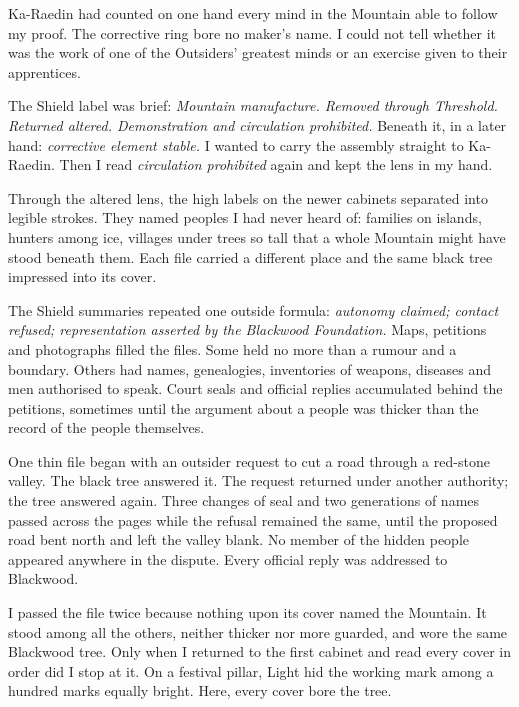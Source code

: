 Ka-Raedin had counted on one hand every mind in the Mountain able to follow my proof. The corrective ring bore no maker's name. I could not tell whether it was the work of one of the Outsiders' greatest minds or an exercise given to their apprentices.\par

The Shield label was brief: \textit{Mountain manufacture. Removed through Threshold. Returned altered. Demonstration and circulation prohibited.} Beneath it, in a later hand: \textit{corrective element stable.} I wanted to carry the assembly straight to Ka-Raedin. Then I read \textit{circulation prohibited} again and kept the lens in my hand.\par

Through the altered lens, the high labels on the newer cabinets separated into legible strokes. They named peoples I had never heard of: families on islands, hunters among ice, villages under trees so tall that a whole Mountain might have stood beneath them. Each file carried a different place and the same black tree impressed into its cover.\par

The Shield summaries repeated one outside formula: \textit{autonomy claimed; contact refused; representation asserted by the Blackwood Foundation.} Maps, petitions and photographs filled the files. Some held no more than a rumour and a boundary. Others had names, genealogies, inventories of weapons, diseases and men authorised to speak. Court seals and official replies accumulated behind the petitions, sometimes until the argument about a people was thicker than the record of the people themselves. \par

One thin file began with an outsider request to cut a road through a red-stone valley. The black tree answered it. The request returned under another authority; the tree answered again. Three changes of seal and two generations of names passed across the pages while the refusal remained the same, until the proposed road bent north and left the valley blank. No member of the hidden people appeared anywhere in the dispute. Every official reply was addressed to Blackwood.\par

I passed the file twice because nothing upon its cover named the Mountain. It stood among all the others, neither thicker nor more guarded, and wore the same Blackwood tree. Only when I returned to the first cabinet and read every cover in order did I stop at it. On a festival pillar, Light hid the working mark among a hundred marks equally bright. Here, every cover bore the tree.\par

